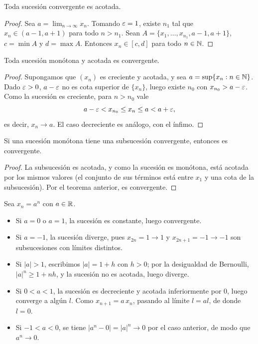 \begin{theorem}
  Toda sucesión convergente es acotada.
\end{theorem}

\begin{proof}
  Sea \(a = \lim_{n \to \infty} x_n\). Tomando \(\varepsilon = 1\), existe \(n_1\) tal que \(x_n \in (a - 1, a + 1)\) para todo \(n > n_1\). Sean \(A = \{ x_1, \dots, x_{n_1}, a - 1, a + 1 \}\), \(c = \min A\) y \(d = \max A\). Entonces \(x_n \in [c, d]\) para todo \(n \in \mathbb{N}\).
\end{proof}

\begin{theorem}
  Toda sucesión monótona y acotada es convergente.
\end{theorem}

\begin{proof}
  Supongamos que \({(x_n)}\) es creciente y acotada, y sea \(a = \sup \{ x_n : n \in \mathbb{N} \}\). Dado \(\varepsilon > 0\), \(a - \varepsilon\) no es cota superior de \(\{ x_n \}\), luego existe \(n_0\) con \(x_{n_0} > a - \varepsilon\). Como la sucesión es creciente, para \(n > n_0\) vale
  \[
    a - \varepsilon < x_{n_0} \leq x_n \leq a < a + \varepsilon,
  \]
  es decir, \(x_n \to a\). El caso decreciente es análogo, con el ínfimo.
\end{proof}

\begin{corollary}
  Si una sucesión monótona tiene una subsucesión convergente, entonces es convergente.
\end{corollary}

\begin{proof}
  La subsucesión es acotada, y como la sucesión es monótona, está acotada por los mismos valores (el conjunto de sus términos está entre \(x_1\) y una cota de la subsucesión). Por el teorema anterior, es convergente.
\end{proof}

\begin{eg}
  Sea \(x_n = a^n\) con \(a \in \mathbb{R}\).
  \begin{itemize}
    \item Si \(a = 0\) o \(a = 1\), la sucesión es constante, luego convergente.
    \item Si \(a = -1\), la sucesión diverge, pues \(x_{2n} = 1 \to 1\) y \(x_{2n+1} = -1 \to -1\) son subsucesiones con límites distintos.
    \item Si \(|a| > 1\), escribimos \(|a| = 1 + h\) con \(h > 0\); por la desigualdad de Bernoulli, \(|a|^n \geq 1 + nh\), y la sucesión no es acotada, luego diverge.
    \item Si \(0 < a < 1\), la sucesión es decreciente y acotada inferiormente por \(0\), luego converge a algún \(l\). Como \(x_{n+1} = a \, x_n\), pasando al límite \(l = a l\), de donde \(l = 0\).
    \item Si \(-1 < a < 0\), se tiene \(|a^n - 0| = |a|^n \to 0\) por el caso anterior, de modo que \(a^n \to 0\).
  \end{itemize}
\end{eg}

